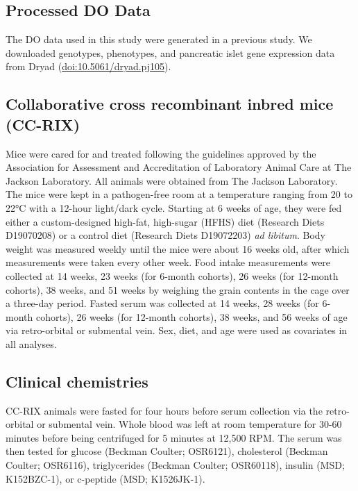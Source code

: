 \documentclass[
]{article}
\begin{document}
\subsection{Processed DO Data}\label{processed-do-data}

The DO data used in this study were generated in a previous
study\cite{pmid31343992, pmid29567659}. We downloaded genotypes,
phenotypes, and pancreatic islet gene expression data from Dryad
(\url{doi:10.5061/dryad.pj105}).

\subsection{Collaborative cross recombinant inbred mice
(CC-RIX)}\label{collaborative-cross-recombinant-inbred-mice-cc-rix}

Mice were cared for and treated following the guidelines approved by the
Association for Assessment and Accreditation of Laboratory Animal Care
at The Jackson Laboratory. All animals were obtained from The Jackson
Laboratory. The mice were kept in a pathogen-free room at a temperature
ranging from 20 to 22°C with a 12-hour light/dark cycle. Starting at 6
weeks of age, they were fed either a custom-designed high-fat,
high-sugar (HFHS) diet (Research Diets D19070208) or a control diet
(Research Diets D19072203) \textit{ad libitum}. Body weight was measured
weekly until the mice were about 16 weeks old, after which measurements
were taken every other week. Food intake measurements were collected at
14 weeks, 23 weeks (for 6-month cohorts), 26 weeks (for 12-month
cohorts), 38 weeks, and 51 weeks by weighing the grain contents in the
cage over a three-day period. Fasted serum was collected at 14 weeks, 28
weeks (for 6-month cohorts), 26 weeks (for 12-month cohorts), 38 weeks,
and 56 weeks of age via retro-orbital or submental vein. Sex, diet, and
age were used as covariates in all analyses.

\subsection{Clinical chemistries}\label{clinical-chemistries}

CC-RIX animals were fasted for four hours before serum collection via
the retro-orbital or submental vein. Whole blood was left at room
temperature for 30-60 minutes before being centrifuged for 5 minutes at
12,500 RPM. The serum was then tested for glucose (Beckman Coulter;
OSR6121), cholesterol (Beckman Coulter; OSR6116), triglycerides (Beckman
Coulter; OSR60118), insulin (MSD; K152BZC-1), or c-peptide (MSD;
K1526JK-1).
\end{document}
